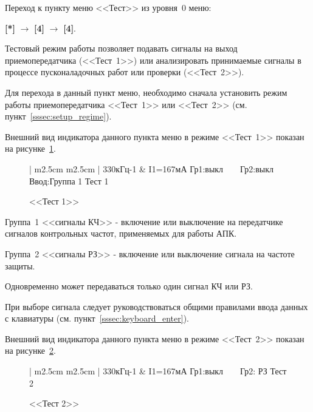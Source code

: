 Переход к пункту меню <<Тест>> из уровня~0 меню: 

\textbf{[*]} $\rightarrow$ \textbf{[4]} $\rightarrow$ \textbf{[4]}.

Тестовый режим работы позволяет подавать сигналы на выход приемопередатчика (<<Тест~1>>) или анализировать принимаемые сигналы в процессе пусконаладочных работ или проверки (<<Тест~2>>).

Для перехода в данный пункт меню, необходимо сначала установить режим работы приемопередатчика <<Тест~1>> или <<Тест~2>> (см. пункт~\ref{sssec:setup_regime}).

Внешний вид индикатора данного пункта меню в режиме <<Тест~1>> показан на рисунке~\ref{fig:setup_test_1}.
 
\begin{figure}[H]
	\centering
		
	\begin{tabular}{| m{2.5cm}  m{2.5cm} |}
		\firsthline
		330кГц-1	& \raggedleft I1=167мА			\tabularnewline 
		 {Гр1:выкл~~~~Гр2:выкл}	\tabularnewline
		 {Ввод:Группа 1} 		\tabularnewline 
		 {Тест 1}				\tabularnewline 
		\lasthline
	\end{tabular} 
	
	\caption{<<Тест 1>>}
	\label{fig:setup_test_1}
\end{figure}

Группа~1 <<сигналы КЧ>> - включение или выключение на передатчике сигналов контрольных частот, применяемых для работы АПК. 

Группа~2 <<сигналы РЗ>> - включение или выключение сигнала на частоте защиты. 

Одновременно может передаваться только один сигнал КЧ или РЗ.

При выборе сигнала следует руководствоваться общими правилами ввода данных с клавиатуры (см. пункт~\ref{sssec:keyboard_enter}).

Внешний вид индикатора данного пункта меню в режиме <<Тест~2>> показан на рисунке~\ref{fig:setup_test_2}.
 
\begin{figure}[H]
	\centering
	
	\begin{tabular}{| m{2.5cm}  m{2.5cm} |}
		\firsthline
		330кГц-1	& \raggedleft I1=167мА			\tabularnewline 
		 {Гр1:выкл~~~~Гр2: РЗ}	\tabularnewline
		 {} 					\tabularnewline 
		 {Тест 2}				\tabularnewline 
		\lasthline
	\end{tabular} 
	
	\caption{<<Тест 2>>}
	\label{fig:setup_test_2}
\end{figure}

